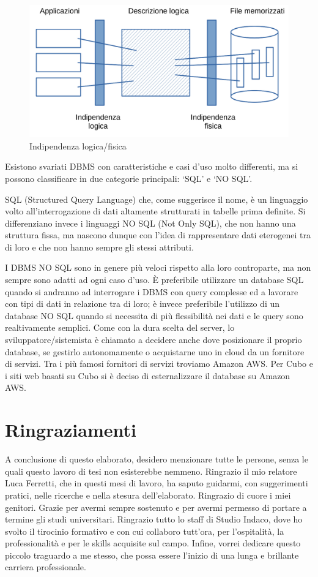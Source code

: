 \documentclass[12pt,a4paper]{article}
\begin{document}
\begin{figure}[H]
    \centering
    \includegraphics[width=.9\linewidth]{indipendenza_logica_fisica.png}
    \caption{Indipendenza logica/fisica}
\end{figure}

Esistono svariati DBMS con caratteristiche e casi d’uso molto differenti, ma si possono classificare in due categorie principali: ‘SQL’ e ‘NO SQL’.

SQL (Structured Query Language) che, come suggerisce il nome, è un linguaggio volto all’interrogazione di dati altamente strutturati in tabelle prima definite.
Si differenziano invece i linguaggi NO SQL (Not Only SQL), che non hanno una struttura fissa, ma nascono dunque con l’idea di rappresentare dati eterogenei tra di loro e che non hanno sempre gli stessi attributi.

I DBMS NO SQL sono in genere più veloci rispetto alla loro controparte, ma non sempre sono adatti ad ogni caso d’uso. È preferibile utilizzare un database SQL quando si andranno ad interrogare i DBMS con query complesse ed a lavorare con tipi di dati in relazione tra di loro; è invece preferibile l’utilizzo di un database NO SQL quando si necessita di più flessibilità nei dati e le query sono realtivamente semplici.
Come con la dura scelta del server, lo sviluppatore/sistemista è chiamato a decidere anche dove posizionare il proprio database, se gestirlo autonomamente o acquistarne uno in cloud da un fornitore di servizi. Tra i più famosi fornitori di servizi troviamo Amazon AWS. Per Cubo e i siti web basati su Cubo si è deciso di esternalizzare il database su Amazon AWS.

\clearpage

\section*{Ringraziamenti}
A conclusione di questo elaborato, desidero menzionare tutte le persone, senza le quali questo lavoro di tesi non esisterebbe nemmeno.
Ringrazio il mio relatore Luca Ferretti, che in questi mesi di lavoro, ha saputo guidarmi, con suggerimenti pratici, nelle ricerche e nella stesura dell’elaborato.
Ringrazio di cuore i miei genitori. Grazie per avermi sempre sostenuto e per avermi permesso di portare a termine gli studi universitari.
Ringrazio tutto lo staff di Studio Indaco, dove ho svolto il tirocinio formativo e con cui collaboro tutt'ora, per l’ospitalità, la professionalità e per le skills acquisite sul campo.
Infine, vorrei dedicare questo piccolo traguardo a me stesso, che possa essere l’inizio di una lunga e brillante carriera professionale.
\end{document}
